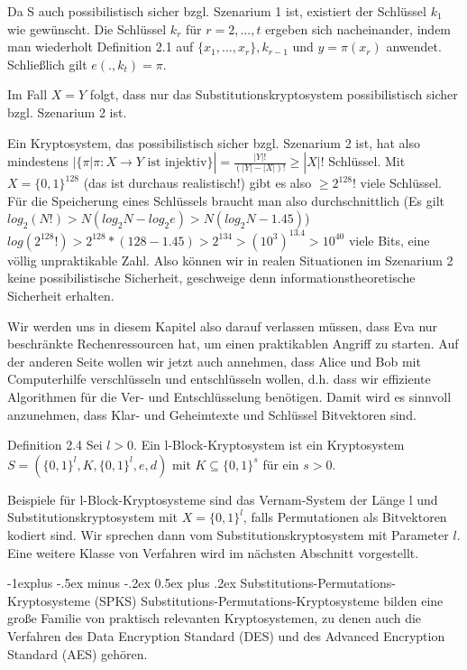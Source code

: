 \documentclass[a4paper]{article}
\makeatletter
\renewcommand{\subsection}{\@startsection{subsection}{2}{0mm}%
 {-1explus -.5ex minus -.2ex}%
 {0.5ex plus .2ex}%
 {\normalfont\normalsize\bfseries}}
\makeatother
\begin{document}
\begin{multicols}{3}
    Da S auch possibilistisch sicher bzgl. Szenarium 1 ist, existiert der Schlüssel $k_1$ wie gewünscht. Die Schlüssel $k_r$ für $r=2,...,t$ ergeben sich nacheinander, indem man wiederholt Definition 2.1 auf $\{x_1,...,x_r\},k_{r-1}$ und $y=\pi(x_r)$ anwendet. Schließlich gilt $e(.,k_t)=\pi$.

    Im Fall $X=Y$ folgt, dass nur das Substitutionskryptosystem possibilistisch sicher bzgl. Szenarium 2 ist.

    Ein Kryptosystem, das possibilistisch sicher bzgl. Szenarium 2 ist, hat also mindestens $|\{\pi |\pi :X\rightarrow Y\text{ ist injektiv}\}|=\frac{|Y|!}{(|Y|-|X|)!} \geq |X|!$ Schlüssel. Mit $X=\{0,1\}^{128}$  (das ist durchaus realistisch!) gibt es also $\geq 2^{128}!$ viele Schlüssel. Für die Speicherung eines Schlüssels braucht man also durchschnittlich (Es gilt $log_2(N!)>N(log_2 N-log_2 e)> N(log_2 N- 1.45)$) $log(2^{128}!)> 2^{128}*(128- 1.45)> 2^{134}>(10^3 )^{13.4} > 10^{40}$ viele Bits, eine völlig unpraktikable Zahl.
    Also können wir in realen Situationen im Szenarium 2 keine possibilistische Sicherheit, geschweige denn informationstheoretische Sicherheit erhalten.

    Wir werden uns in diesem Kapitel also darauf verlassen müssen, dass Eva nur beschränkte Rechenressourcen hat, um einen praktikablen Angriff zu starten. Auf der anderen Seite wollen wir jetzt auch annehmen, dass Alice und Bob mit Computerhilfe verschlüsseln und entschlüsseln wollen, d.h. dass wir effiziente Algorithmen für die Ver- und Entschlüsselung benötigen. Damit wird es sinnvoll anzunehmen, dass Klar- und Geheimtexte und Schlüssel Bitvektoren sind.

    Definition 2.4 Sei $l>0$. Ein l-Block-Kryptosystem ist ein Kryptosystem $S=(\{0,1\}^l,K,\{0,1\}^l,e,d)$ mit $K\subseteq \{0,1\}^s$ für ein $s>0$.

    Beispiele für l-Block-Kryptosysteme sind das Vernam-System der Länge l und Substitutionskryptosystem mit $X=\{0,1\}^l$, falls Permutationen als Bitvektoren kodiert sind. Wir sprechen dann vom Substitutionskryptosystem mit Parameter $l$.
    Eine weitere Klasse von Verfahren wird im nächsten Abschnitt vorgestellt.

    \subsection{Substitutions-Permutations-Kryptosysteme (SPKS)}
    Substitutions-Permutations-Kryptosysteme bilden eine große Familie von praktisch relevanten Kryptosystemen, zu denen auch die Verfahren des Data Encryption Standard (DES) und des Advanced Encryption Standard (AES) gehören.


\end{multicols}
\end{document}
